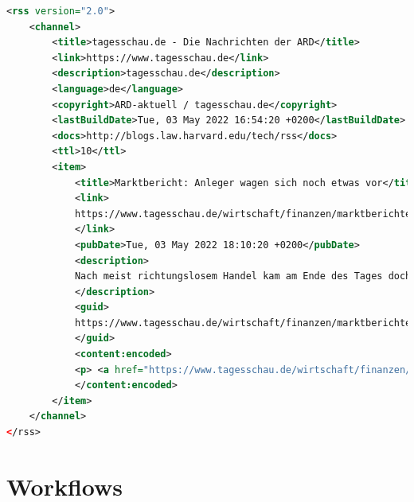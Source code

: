 \begin{lstlisting}[title=Tagesschau RSS Feed,language=xml]
<rss version="2.0">
    <channel>
        <title>tagesschau.de - Die Nachrichten der ARD</title>
        <link>https://www.tagesschau.de</link>
        <description>tagesschau.de</description>
        <language>de</language>
        <copyright>ARD-aktuell / tagesschau.de</copyright>
        <lastBuildDate>Tue, 03 May 2022 16:54:20 +0200</lastBuildDate>
        <docs>http://blogs.law.harvard.edu/tech/rss</docs>
        <ttl>10</ttl>
        <item>
            <title>Marktbericht: Anleger wagen sich noch etwas vor</title>
            <link>
            https://www.tagesschau.de/wirtschaft/finanzen/marktberichte/boerse-marktbericht-dax-dow-jones-101.html
            </link>
            <pubDate>Tue, 03 May 2022 18:10:20 +0200</pubDate>
            <description>
            Nach meist richtungslosem Handel kam am Ende des Tages doch noch etwas Interesse auf. Die Anleger warten derweil mit Spannung auf die Ergebnisse der Zinssitzung der US-Notenbank.
            </description>
            <guid>
            https://www.tagesschau.de/wirtschaft/finanzen/marktberichte/boerse-marktbericht-dax-dow-jones-101.html
            </guid>
            <content:encoded>
            <p> <a href="https://www.tagesschau.de/wirtschaft/finanzen/marktberichte/boerse-marktbericht-dax-dow-jones-101.html"><img src="https://www.tagesschau.de/multimedia/bilder/boerse-frankfurt-141~_v-mittel16x9.jpg"/></a> <br/> <br/> Nach meist richtungslosem Handel kam am Ende des Tages doch noch etwas Interesse auf. Die Anleger warten derweil mit Spannung auf die Ergebnisse der Zinssitzung der US-Notenbank. <a href="https://www.tagesschau.de/wirtschaft/finanzen/marktberichte/boerse-marktbericht-dax-dow-jones-101.html">mehr</a> </p> <ul> </ul> </p> <p><a href="https://www.tagesschau.de/wirtschaft/finanzen/marktberichte/boerse-marktbericht-dax-dow-jones-101.html">Meldung bei www.tagesschau.de lesen</a></p>
            </content:encoded>
        </item>
    </channel>
</rss>
\end{lstlisting}

\section{Workflows}
